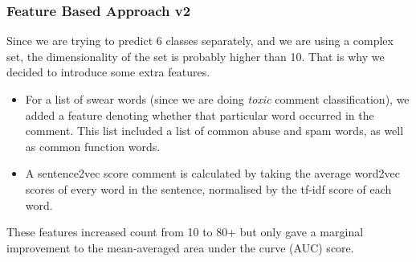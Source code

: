 \documentclass[10pt, a4paper]{article}
\begin{document}
\begin{multicols}{2}
		
		\subsubsection{Feature Based Approach v2}
		
		
		Since we are trying to predict 6 classes separately, and we are using a  complex set, the dimensionality of the set is probably higher than 10. That is why we decided to introduce some extra features.
		
		\begin{itemize}
			\item For a list of swear words (since we are doing \emph{toxic} comment classification), we added a feature denoting whether that particular word occurred in the comment. This list included a list of common abuse and spam words, as well as common function words.
			\item  A sentence2vec score comment is calculated by taking the average word2vec scores of every word in the sentence, normalised by the tf-idf score of each word.
		\end{itemize}
		These features increased count from 10 to 80+ but only gave a marginal improvement to the mean-averaged area under the curve (AUC) score.
		

\end{multicols}
\end{document}
